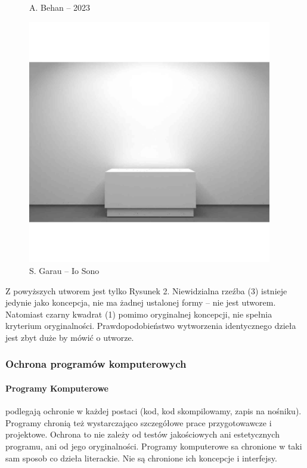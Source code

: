 \documentclass{article}
\begin{document}
\begin{figure}[h]
  \caption{A. Behan -- 2023}\label{fig:behandomek}
  \endminipage\hfill
  \includegraphics[width=0.95\textwidth]{iosononiewidzialne}
  \caption{S. Garau -- Io Sono}\label{fig:iosononiewidzialne}
  \endminipage
\end{figure}

Z powyższych utworem jest tylko Rysunek 2.
Niewidzialna rzeźba (3) istnieje jedynie jako koncepcja, nie ma żadnej ustalonej formy -- nie jest utworem.
Natomiast czarny kwadrat (1) pomimo oryginalnej koncepcji, nie spełnia kryterium oryginalności.
Prawdopodobieństwo wytworzenia identycznego dzieła jest zbyt duże by mówić o utworze.



\subsubsection{Ochrona programów komputerowych}

\paragraph{Programy Komputerowe}
podlegają ochronie w każdej postaci (kod, kod skompilowamy, zapis na nośniku).
Programy chronią też wystarczająco szczegółowe prace przygotowawcze i projektowe.
Ochrona to nie zależy od testów jakościowych ani estetycznych programu, ani od jego oryginalności.
Programy komputerowe sa chronione w taki sam sposob co dzieła literackie.
Nie są chronione ich koncepcje i interfejsy.
\end{document}
